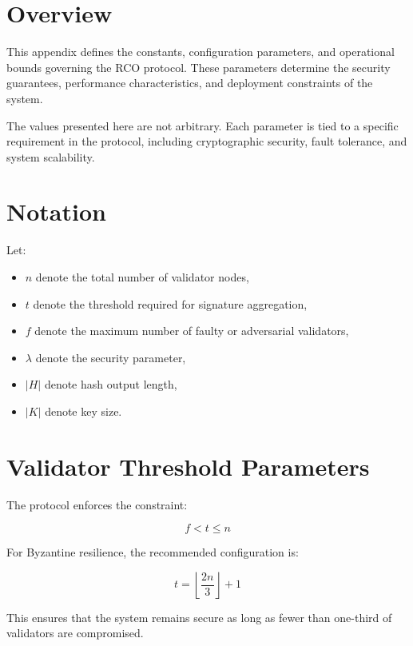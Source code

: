 \section{Overview}

This appendix defines the constants, configuration parameters, and operational bounds governing the RCO protocol. These parameters determine the security guarantees, performance characteristics, and deployment constraints of the system.

The values presented here are not arbitrary. Each parameter is tied to a specific requirement in the protocol, including cryptographic security, fault tolerance, and system scalability.

\section{Notation}

Let:

\begin{itemize}
\item $n$ denote the total number of validator nodes,
\item $t$ denote the threshold required for signature aggregation,
\item $f$ denote the maximum number of faulty or adversarial validators,
\item $\lambda$ denote the security parameter,
\item $|H|$ denote hash output length,
\item $|K|$ denote key size.
\end{itemize}

\section{Validator Threshold Parameters}

The protocol enforces the constraint:

\begin{equation}
f < t \leq n
\end{equation}

For Byzantine resilience, the recommended configuration is:

\begin{equation}
t = \left\lfloor \frac{2n}{3} \right\rfloor + 1
\end{equation}

This ensures that the system remains secure as long as fewer than one-third of validators are compromised.

